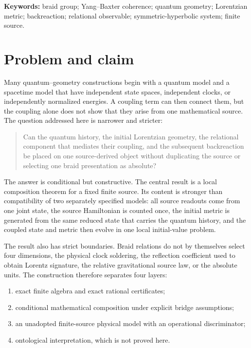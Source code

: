 \documentclass[11pt]{article}
\theoremstyle{definition}
\theoremstyle{remark}
\begin{document}
\noindent\textbf{Keywords:} braid group; Yang--Baxter coherence; quantum geometry; Lorentzian metric; backreaction; relational observable; symmetric-hyperbolic system; finite source.

\section{Problem and claim}

Many quantum--geometry constructions begin with a quantum model and a spacetime model that have independent state spaces, independent clocks, or independently normalized energies. A coupling term can then connect them, but the coupling alone does not show that they arise from one mathematical source. The question addressed here is narrower and stricter:

\begin{quote}
Can the quantum history, the initial Lorentzian geometry, the relational component that mediates their coupling, and the subsequent backreaction be placed on one source-derived object without duplicating the source or selecting one braid presentation as absolute?
\end{quote}

The answer is conditional but constructive. The central result is a local composition theorem for a fixed finite source. Its content is stronger than compatibility of two separately specified models: all source readouts come from one joint state, the source Hamiltonian is counted once, the initial metric is generated from the same reduced state that carries the quantum history, and the coupled state and metric then evolve in one local initial-value problem.

The result also has strict boundaries. Braid relations do not by themselves select four dimensions, the physical clock soldering, the reflection coefficient used to obtain Lorentz signature, the relative gravitational source law, or the absolute units. The construction therefore separates four layers:

\begin{enumerate}
\item exact finite algebra and exact rational certificates;
\item conditional mathematical composition under explicit bridge assumptions;
\item an unadopted finite-source physical model with an operational discriminator;
\item ontological interpretation, which is not proved here.
\end{enumerate}
\end{document}
